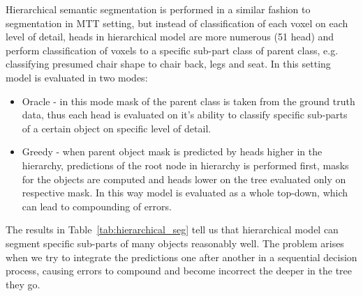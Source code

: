 Hierarchical semantic segmentation is performed in a similar fashion to segmentation in MTT setting, but instead of classification of each voxel on each level of detail, heads in hierarchical model are more numerous (51 head) and perform classification of voxels to a specific sub-part class of parent class, e.g. classifying presumed chair shape to chair back, legs and seat. In this setting model is evaluated in two modes:
\begin{itemize}
    \item Oracle - in this mode mask of the parent class is taken from the ground truth data, thus each head is evaluated on it's ability to classify specific sub-parts of a certain object on specific level of detail. 
    \item Greedy - when parent object mask is predicted by heads higher in the hierarchy, predictions of the root node in hierarchy is performed first, masks for the objects are computed and heads lower on the tree evaluated only on respective mask. In this way model is evaluated as a whole top-down, which can lead to compounding of errors.
\end{itemize}
The results in Table~\ref{tab:hierarchical_seg} tell us that hierarchical model can segment specific sub-parts of many objects reasonably well. The problem arises when we try to integrate the predictions one after another in a sequential decision process, causing errors to compound and become incorrect the deeper in the tree they go.

